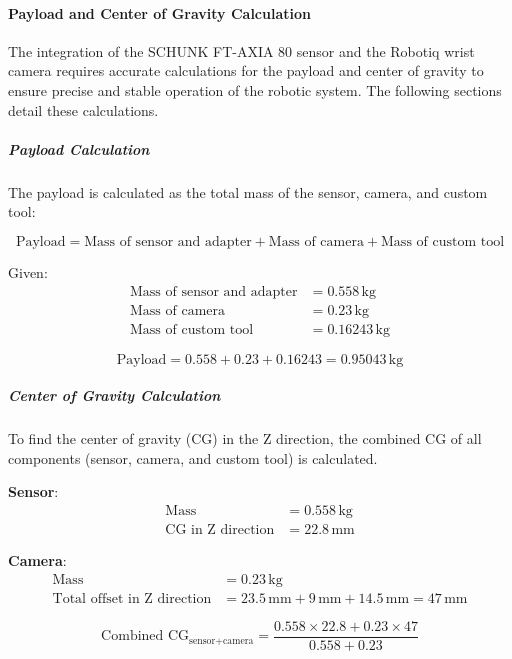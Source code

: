 \paragraph{Payload and Center of Gravity Calculation}

The integration of the SCHUNK FT-AXIA 80 sensor and the Robotiq wrist camera requires accurate calculations for the payload and center of gravity to ensure precise and stable operation of the robotic system. The following sections detail these calculations.

\subparagraph{Payload Calculation}

The payload is calculated as the total mass of the sensor, camera, and custom tool:

\begin{equation}
\text{Payload} = \text{Mass of sensor and adapter} + \text{Mass of camera} + \text{Mass of custom tool}
\end{equation}

Given:
\begin{align*}
\text{Mass of sensor and adapter} &= 0.558 \, \text{kg} \\
\text{Mass of camera} &= 0.23 \, \text{kg} \\
\text{Mass of custom tool} &= 0.16243 \, \text{kg}
\end{align*}

\begin{equation}
\text{Payload} = 0.558 + 0.23 + 0.16243 = 0.95043 \, \text{kg}
\end{equation}

\subparagraph{Center of Gravity Calculation}

To find the center of gravity (CG) in the Z direction, the combined CG of all components (sensor, camera, and custom tool) is calculated.

\textbf{Sensor}:
\begin{align*}
\text{Mass} &= 0.558 \, \text{kg} \\
\text{CG in Z direction} &= 22.8 \, \text{mm}
\end{align*}

\textbf{Camera}:
\begin{align*}
\text{Mass} &= 0.23 \, \text{kg} \\
\text{Total offset in Z direction} &= 23.5 \, \text{mm} + 9 \, \text{mm} + 14.5 \, \text{mm} = 47 \, \text{mm}
\end{align*}

\begin{equation}
\text{Combined CG}_{\text{sensor+camera}} = \frac{0.558 \times 22.8 + 0.23 \times 47}{0.558 + 0.23}
\end{equation}

